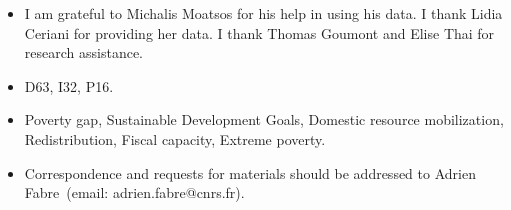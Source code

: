 \documentclass[12pt,english]{article}
\begin{document}
\theendnotes



\begin{itemize}
\item[Acknowledgments] I am grateful to Michalis Moatsos for his help in using his data. I thank Lidia Ceriani for providing her data. I thank Thomas Goumont and Elise Thai for research assistance. 
\item[JEL codes] D63, I32, P16.
\item[Keywords]  Poverty gap, Sustainable Development Goals, Domestic resource mobilization, Redistribution, Fiscal capacity, Extreme poverty.
\item[Correspondence] Correspondence and requests for materials should be addressed to Adrien Fabre~(email: adrien.fabre@cnrs.fr).
\end{itemize}

\listoftables
\listoffigures

\appendix %
\renewcommand{\thetable}{A\arabic{table}}
\renewcommand{\thefigure}{A\arabic{figure}}
\setcounter{figure}{0}
\setcounter{table}{0}
\end{document}
